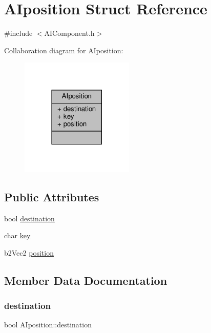 \hypertarget{structAIposition}{}\section{A\+Iposition Struct Reference}
\label{structAIposition}


{\ttfamily \#include $<$A\+I\+Component.\+h$>$}



Collaboration diagram for A\+Iposition\+:
\nopagebreak
\begin{figure}[H]
\begin{center}
\leavevmode
\includegraphics[width=153pt]{structAIposition__coll__graph}
\end{center}
\end{figure}
\subsection*{Public Attributes}
\begin{DoxyCompactItemize}
\item 
bool \hyperlink{structAIposition_ab257c742a240b65925b4acd16cba0781}{destination}
\item 
char \hyperlink{structAIposition_a47a0e37eaa5513e5a4faa85473d13ed2}{key}
\item 
b2\+Vec2 \hyperlink{structAIposition_a6c93076273538f58a68378957f6baf4c}{position}
\end{DoxyCompactItemize}


\subsection{Member Data Documentation}
\mbox{\label{structAIposition_ab257c742a240b65925b4acd16cba0781}} 
\subsubsection{\texorpdfstring{destination}{destination}}
{\footnotesize\ttfamily bool A\+Iposition\+::destination}

